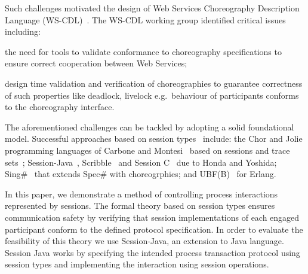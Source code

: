 \documentclass{llncs}
\begin{document}

Such challenges motivated the design of Web Services Choreography Description Language (WS-CDL)~\cite{session-types-sessions}. The WS-CDL working group identified critical issues~\cite{ws-critical-overview} including:
\begin{compactenum}
	\item the need for tools to validate conformance to choreography specifications to ensure correct cooperation between Web Services;
	\item design time validation and verification of choreographies to guarantee correctness of such properties like deadlock, livelock e.g.\ behaviour of participants conforms to the choreography interface.
\end{compactenum}

The aforementioned challenges can be tackled by adopting a solid foundational model. Successful approaches based on session types~\cite{session-types-sessions,carbone2007structured} include: the Chor and Jolie programming languages of Carbone and Montesi~\cite{chor-lang,carbone2013deadlock} based on sessions and trace sets~\cite{chor-essence}; Session-Java~\cite{sj-lang}, Scribble~\cite{honda2011scribbling} and Session C~\cite{ng2012multiparty} due to Honda and Yoshida; Sing\#~\cite{basu2012deciding} that extends Spec\# with choreogrphies; and UBF(B)~\cite{armstrong2002getting} for Erlang.

In this paper, we demonstrate a method of controlling process interactions represented by sessions. The formal theory based on session types ensures communication safety by verifying that session implementations of each engaged participant conform to the defined protocol specification. In order to evaluate the feasibility of this theory we use Session-Java, an extension to Java language. Session Java works by specifying the intended process transaction protocol using session types and implementing the interaction using session operations.
\end{document}
